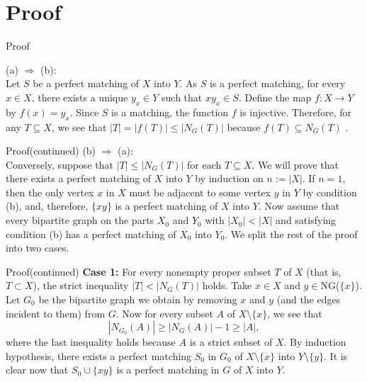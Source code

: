 \documentclass{beamer}
\begin{document}
	
     \section{Proof}
     \begin{frame}{Proof}
     
     		(a) $\Rightarrow$ (b): \\
     		Let $S$ be a perfect matching of $X$ into $Y$. As $S$ is a perfect matching, for every $x \in X$, there exists a unique $y_x \in Y$ such that $xy_x \in S$. Define the map $f : X \to Y$ by $f(x) = y_x$. Since $S$ is a matching, the function $f$ is injective. Therefore, for any $T \subseteq X$, we see that $|T| = |f(T)| \leq |N_G(T)|$ because $f(T) \subseteq N_G(T)$ .
      \end{frame}
	
	\begin{frame}{Proof(continued)}
			(b) $\Rightarrow$ (a):\\
			 Conversely, suppose that $|T| \leq |N_G(T)|$ for each $T \subseteq X$. We will prove that there exists a perfect matching of $X$ into $Y$ by induction on $n := |X|$. If $n = 1$, then the only vertex $x$ in $X$ must be adjacent to some vertex $y$ in $Y$ by condition (b), and, therefore, $\{xy\}$ is a perfect matching of $X$ into $Y$. Now assume that every bipartite graph on the parts $X_0$ and $Y_0$ with $|X_0| < |X|$ and satisfying condition (b) has a perfect matching of $X_0$ into $Y_0$. We split the rest of the proof into two cases.
		
	\end{frame}

   \begin{frame}{Proof(continued)}
   	 	\textbf{Case 1:} For every nonempty proper subset $T$ of $X$ (that is, $T \subset X$), the strict inequality $|T| < |N_G(T)|$ holds. Take $x \in X$ and $y \in $NG($\{x\}$). Let $G_0$ be the bipartite graph we obtain by removing $x$ and $y$ (and the edges incident to them) from $G$. Now for every subset $A$ of $X \setminus \{x\}$, we see that
   	 \[
   	 |N_{G_0}(A)| \geq |N_G(A)| - 1 \geq |A|,
   	 \]
   	 where the last inequality holds because $A$ is a strict subset of $X$. By induction hypothesis, there exists a perfect matching $S_0$ in $G_0$ of $X \setminus \{x\}$ into $Y \setminus \{y\}$. It is clear now that $S_0 \cup \{xy\}$ is a perfect matching in $G$ of $X$ into $Y$.
   \end{frame}
\end{document}

